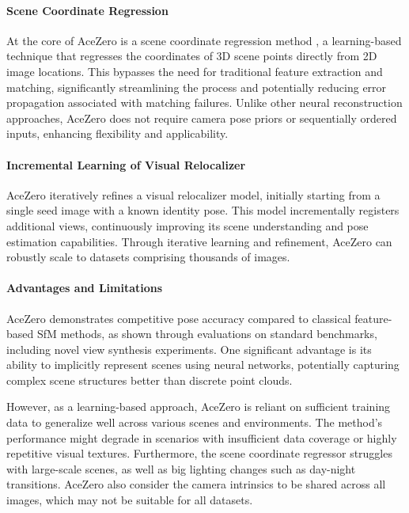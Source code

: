 \paragraph{Scene Coordinate Regression}
At the core of AceZero is a scene coordinate regression method \cite{brachmann2023ace}, a learning-based technique that regresses the coordinates of 3D scene points directly from 2D image locations. 
This bypasses the need for traditional feature extraction and matching, significantly streamlining the process and potentially reducing error propagation associated with matching failures. Unlike other neural reconstruction approaches, AceZero does not require camera pose priors or sequentially ordered inputs, enhancing flexibility and applicability.

\paragraph{Incremental Learning of Visual Relocalizer}
AceZero iteratively refines a visual relocalizer model, initially starting from a single seed image with a known identity pose. 
This model incrementally registers additional views, continuously improving its scene understanding and pose estimation capabilities. 
Through iterative learning and refinement, AceZero can robustly scale to datasets comprising thousands of images.

\paragraph{Advantages and Limitations}
AceZero demonstrates competitive pose accuracy compared to classical feature-based SfM methods, as shown through evaluations on standard benchmarks, including novel view synthesis experiments. 
One significant advantage is its ability to implicitly represent scenes using neural networks, potentially capturing complex scene structures better than discrete point clouds.

However, as a learning-based approach, AceZero is reliant on sufficient training data to generalize well across various scenes and environments. 
The method's performance might degrade in scenarios with insufficient data coverage or highly repetitive visual textures. 
Furthermore, the scene coordinate regressor struggles with large-scale scenes, as well as big lighting changes such as day-night transitions.
AceZero also consider the camera intrinsics to be shared across all images, which may not be suitable for all datasets.

